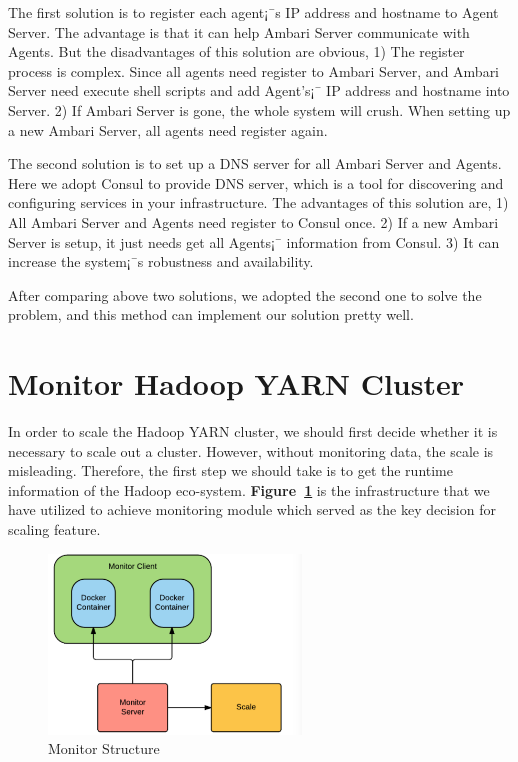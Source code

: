 \documentclass{article}
\begin{document}
The first solution is to register each agent¡¯s IP address and hostname to Agent Server. The advantage is that it can help Ambari Server communicate with Agents. But the disadvantages of this solution are obvious, 1) The register process is complex. Since all agents need register to Ambari Server, and Ambari Server need execute shell scripts and add Agent's¡¯ IP address and hostname into Server. 2) If Ambari Server is gone, the whole system will crush. When setting up a new Ambari Server, all agents need register again.

The second solution is to set up a DNS server for all Ambari Server and Agents. Here we adopt Consul to provide DNS server, which is a tool for discovering and configuring services in your infrastructure. The advantages of this solution are, 1) All Ambari Server and Agents need register to Consul once. 2) If a new Ambari Server is setup, it just needs get all Agents¡¯ information from Consul. 3) It can increase the system¡¯s robustness and availability.

After comparing above two solutions, we adopted the second one to solve the problem, and this method can implement our solution pretty well.




\section{Monitor Hadoop YARN Cluster}
In order to scale the Hadoop YARN cluster, we should first decide whether it is necessary to scale out a cluster.  However, without monitoring data, the scale is misleading. Therefore, the first step we should take is to get the runtime information of the Hadoop eco-system. \textbf{Figure~\ref{fig:monitorStructure}} is the infrastructure that we have utilized to achieve monitoring module which served as the key decision for scaling feature.

\begin{figure}[ht!]
 \centering
 \includegraphics[width=0.6\textwidth,natwidth=500,natheight=300]{fig2.png}
 \caption{Monitor Structure}
 \label{fig:monitorStructure}
 \end{figure}
\end{document}
